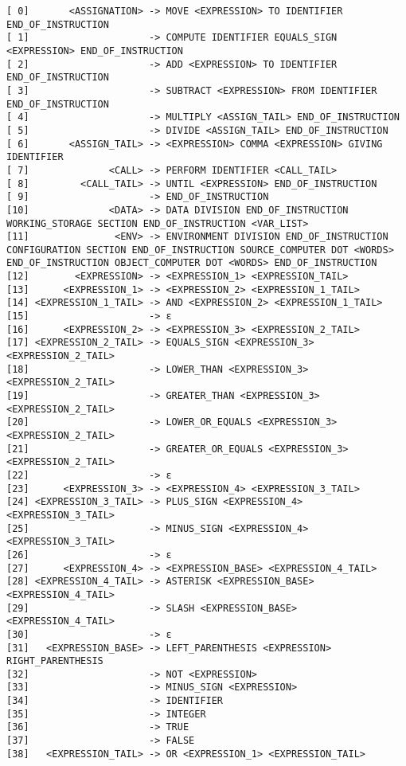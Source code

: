 \begin{verbatim}
[ 0]       <ASSIGNATION> -> MOVE <EXPRESSION> TO IDENTIFIER END_OF_INSTRUCTION
[ 1]                     -> COMPUTE IDENTIFIER EQUALS_SIGN <EXPRESSION> END_OF_INSTRUCTION
[ 2]                     -> ADD <EXPRESSION> TO IDENTIFIER END_OF_INSTRUCTION
[ 3]                     -> SUBTRACT <EXPRESSION> FROM IDENTIFIER END_OF_INSTRUCTION
[ 4]                     -> MULTIPLY <ASSIGN_TAIL> END_OF_INSTRUCTION
[ 5]                     -> DIVIDE <ASSIGN_TAIL> END_OF_INSTRUCTION
[ 6]       <ASSIGN_TAIL> -> <EXPRESSION> COMMA <EXPRESSION> GIVING IDENTIFIER
[ 7]              <CALL> -> PERFORM IDENTIFIER <CALL_TAIL>
[ 8]         <CALL_TAIL> -> UNTIL <EXPRESSION> END_OF_INSTRUCTION
[ 9]                     -> END_OF_INSTRUCTION
[10]              <DATA> -> DATA DIVISION END_OF_INSTRUCTION WORKING_STORAGE SECTION END_OF_INSTRUCTION <VAR_LIST>
[11]               <ENV> -> ENVIRONMENT DIVISION END_OF_INSTRUCTION CONFIGURATION SECTION END_OF_INSTRUCTION SOURCE_COMPUTER DOT <WORDS> END_OF_INSTRUCTION OBJECT_COMPUTER DOT <WORDS> END_OF_INSTRUCTION
[12]        <EXPRESSION> -> <EXPRESSION_1> <EXPRESSION_TAIL> 
[13]      <EXPRESSION_1> -> <EXPRESSION_2> <EXPRESSION_1_TAIL>
[14] <EXPRESSION_1_TAIL> -> AND <EXPRESSION_2> <EXPRESSION_1_TAIL>
[15]                     -> ε
[16]      <EXPRESSION_2> -> <EXPRESSION_3> <EXPRESSION_2_TAIL>
[17] <EXPRESSION_2_TAIL> -> EQUALS_SIGN <EXPRESSION_3> <EXPRESSION_2_TAIL>
[18]                     -> LOWER_THAN <EXPRESSION_3> <EXPRESSION_2_TAIL>
[19]                     -> GREATER_THAN <EXPRESSION_3> <EXPRESSION_2_TAIL>
[20]                     -> LOWER_OR_EQUALS <EXPRESSION_3> <EXPRESSION_2_TAIL>
[21]                     -> GREATER_OR_EQUALS <EXPRESSION_3> <EXPRESSION_2_TAIL>
[22]                     -> ε
[23]      <EXPRESSION_3> -> <EXPRESSION_4> <EXPRESSION_3_TAIL>
[24] <EXPRESSION_3_TAIL> -> PLUS_SIGN <EXPRESSION_4> <EXPRESSION_3_TAIL>
[25]                     -> MINUS_SIGN <EXPRESSION_4> <EXPRESSION_3_TAIL>
[26]                     -> ε
[27]      <EXPRESSION_4> -> <EXPRESSION_BASE> <EXPRESSION_4_TAIL>
[28] <EXPRESSION_4_TAIL> -> ASTERISK <EXPRESSION_BASE> <EXPRESSION_4_TAIL>
[29]                     -> SLASH <EXPRESSION_BASE> <EXPRESSION_4_TAIL>
[30]                     -> ε
[31]   <EXPRESSION_BASE> -> LEFT_PARENTHESIS <EXPRESSION> RIGHT_PARENTHESIS
[32]                     -> NOT <EXPRESSION>
[33]                     -> MINUS_SIGN <EXPRESSION>
[34]                     -> IDENTIFIER
[35]                     -> INTEGER
[36]                     -> TRUE
[37]                     -> FALSE
[38]   <EXPRESSION_TAIL> -> OR <EXPRESSION_1> <EXPRESSION_TAIL>

\end{verbatim}

